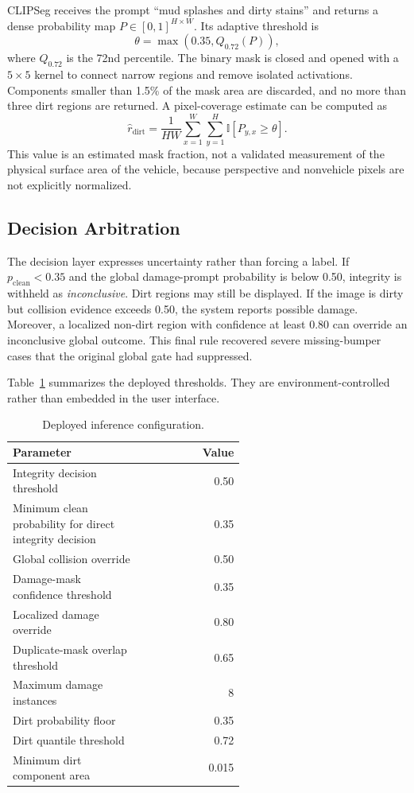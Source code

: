 \documentclass[conference]{IEEEtran}
\begin{document}
CLIPSeg receives the prompt ``mud splashes and dirty stains'' and returns a dense probability map $P\in[0,1]^{H\times W}$. Its adaptive threshold is
\begin{equation}
    \theta = \max\left(0.35, Q_{0.72}(P)\right),
    \label{eq:dirtthreshold}
\end{equation}
where $Q_{0.72}$ is the 72nd percentile. The binary mask is closed and opened with a $5\times5$ kernel to connect narrow regions and remove isolated activations. Components smaller than 1.5\% of the mask area are discarded, and no more than three dirt regions are returned. A pixel-coverage estimate can be computed as
\begin{equation}
    \hat{r}_{\mathrm{dirt}}=\frac{1}{HW}
    \sum_{x=1}^{W}\sum_{y=1}^{H}
    \mathbb{I}[P_{y,x}\geq\theta].
    \label{eq:coverage}
\end{equation}
This value is an estimated mask fraction, not a validated measurement of the physical surface area of the vehicle, because perspective and nonvehicle pixels are not explicitly normalized.

\subsection{Decision Arbitration}

The decision layer expresses uncertainty rather than forcing a label. If $p_{\mathrm{clean}}<0.35$ and the global damage-prompt probability is below 0.50, integrity is withheld as \emph{inconclusive}. Dirt regions may still be displayed. If the image is dirty but collision evidence exceeds 0.50, the system reports possible damage. Moreover, a localized non-dirt region with confidence at least 0.80 can override an inconclusive global outcome. This final rule recovered severe missing-bumper cases that the original global gate had suppressed.

Table~\ref{tab:configuration} summarizes the deployed thresholds. They are environment-controlled rather than embedded in the user interface.

\begin{table}[htbp]
\caption{Deployed inference configuration.}
\label{tab:configuration}
\centering
\small
\begin{tabular}{p{0.58\linewidth}r}
\toprule
Parameter & Value \\
\midrule
Integrity decision threshold & 0.50 \\
Minimum clean probability for direct integrity decision & 0.35 \\
Global collision override & 0.50 \\
Damage-mask confidence threshold & 0.35 \\
Localized damage override & 0.80 \\
Duplicate-mask overlap threshold & 0.65 \\
Maximum damage instances & 8 \\
Dirt probability floor & 0.35 \\
Dirt quantile threshold & 0.72 \\
Minimum dirt component area & 0.015 \\
\bottomrule
\end{tabular}
\end{table}
\end{document}
